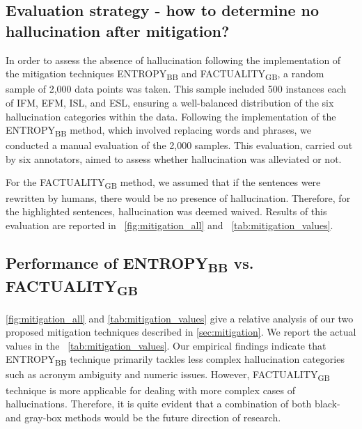 \subsection{Evaluation strategy - how to determine no hallucination after mitigation?}
\label{sec:eval_strategy}
In order to assess the absence of hallucination following the implementation of the mitigation techniques ENTROPY\textsubscript{BB} and FACTUALITY\textsubscript{GB}, a random sample of 2,000 data points was taken. This sample included 500 instances each of IFM, EFM, ISL, and ESL, ensuring a well-balanced distribution of the six hallucination categories within the data. Following the implementation of the ENTROPY\textsubscript{BB} method, which involved replacing words and phrases, we conducted a manual evaluation of the 2,000 samples. This evaluation, carried out by six annotators, aimed to assess whether hallucination was alleviated or not.

For the FACTUALITY\textsubscript{GB} method, we assumed that if the sentences were rewritten by humans, there would be no presence of hallucination. Therefore, for the highlighted sentences, hallucination was deemed waived. Results of this evaluation are reported in ~\cref{fig:mitigation_all} and ~\cref{tab:mitigation_values}.


\subsection{Performance of ENTROPY\textsubscript{BB} vs. FACTUALITY\textsubscript{GB}} \label{app:pp}
\cref{fig:mitigation_all} and \cref{tab:mitigation_values} give a relative analysis of our two proposed mitigation techniques described in \cref{sec:mitigation}. We report the actual values in the ~\cref{tab:mitigation_values}. Our empirical findings indicate that ENTROPY\textsubscript{BB} technique primarily tackles less complex hallucination categories such as acronym ambiguity and numeric issues. However,  FACTUALITY\textsubscript{GB} technique is more applicable for dealing with more complex cases of hallucinations. Therefore, it is quite evident that a combination of both black- and gray-box methods would be the future direction of research.

